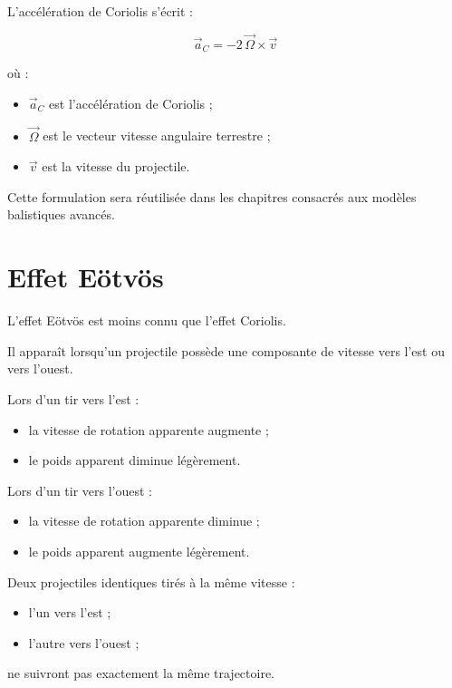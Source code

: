 \begin{rigueur}

L'accélération de Coriolis s'écrit :

\begin{equation}
\vec a_C =
-2\,\vec\Omega \times \vec v
\label{eq:coriolis}
\end{equation}

où :

\begin{itemize}
    \item $\vec a_C$ est l'accélération de Coriolis ;
    \item $\vec\Omega$ est le vecteur vitesse angulaire terrestre ;
    \item $\vec v$ est la vitesse du projectile.
\end{itemize}

\end{rigueur}

Cette formulation sera réutilisée dans les chapitres consacrés aux modèles
balistiques avancés.

\section{Effet Eötvös}

L'effet Eötvös est moins connu que l'effet Coriolis.

Il apparaît lorsqu'un projectile possède une composante de vitesse vers
l'est ou vers l'ouest.

Lors d'un tir vers l'est :

\begin{itemize}
    \item la vitesse de rotation apparente augmente ;
    \item le poids apparent diminue légèrement.
\end{itemize}

Lors d'un tir vers l'ouest :

\begin{itemize}
    \item la vitesse de rotation apparente diminue ;
    \item le poids apparent augmente légèrement.
\end{itemize}

\begin{exemple}

Deux projectiles identiques tirés à la même vitesse :

\begin{itemize}
    \item l'un vers l'est ;
    \item l'autre vers l'ouest ;
\end{itemize}

ne suivront pas exactement la même trajectoire.

\end{exemple}

